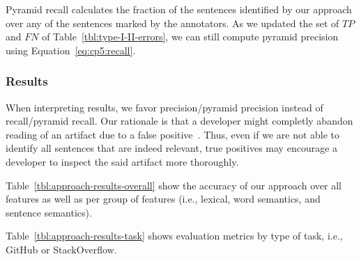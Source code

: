 \vspace{2mm}
Pyramid recall calculates the fraction of the sentences identified by our approach over 
any of the sentences marked by the annotators. As we updated the set of $TP$ and $FN$ of Table~\ref{tbl:type-I-II-errors}, we can still compute pyramid precision using Equation~\ref{eq:cp5:recall}.




\subsubsection{Results}


When interpreting results, we favor precision/pyramid precision instead of recall/pyramid recall.
Our rationale is that a developer might completly abandon reading of an artifact 
due to a false positive~\cite{Singer1998, Brandt2009a}.
Thus, even if we are not able to identify all sentences that are indeed relevant, true positives may encourage a developer to inspect the said artifact more thoroughly.



Table~\ref{tbl:approach-results-overall} show the accuracy of our approach 
over all features as well as per group of features (i.e., lexical, word semantics, and sentence semantics).






Table~\ref{tbl:approach-results-task} shows evaluation metrics by type of task, i.e., GitHub or StackOverflow.



